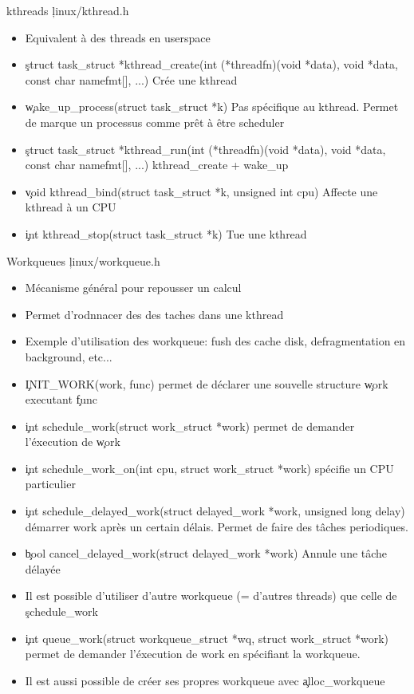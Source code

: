 \begin{frame}{kthreads}
\c{linux/kthread.h}
\begin{itemize}
\item Equivalent à des threads en userspace
\item \c{struct task_struct *kthread_create(int (*threadfn)(void *data), void *data, const char namefmt[], ...)} Crée une kthread
\item \c{wake_up_process(struct task_struct *k)} Pas spécifique au kthread. Permet de marque un processus comme prêt à être scheduler
\item \c{struct task_struct *kthread_run(int (*threadfn)(void *data), void *data, const char namefmt[], ...)} kthread_create + wake_up
\item \c{void kthread_bind(struct task_struct *k, unsigned int cpu)} Affecte une kthread à un CPU
\item \c{int kthread_stop(struct task_struct *k)} Tue une kthread
\end{itemize} 
\end{frame} 

\begin{frame}{Workqueues}
\c{linux/workqueue.h}
\begin{itemize} 
\item Mécanisme général pour repousser un calcul
\item Permet d'rodnnacer des des taches dans une kthread
\item Exemple d'utilisation des workqueue: fush des cache disk, defragmentation en background, etc...
\item \c{INIT_WORK(work, func)} permet de déclarer une souvelle structure \c{work} executant \c{func}
\item \c{int schedule_work(struct work_struct *work)} permet de demander l'éxecution de \c{work}
\item \c{int schedule_work_on(int cpu, struct work_struct *work)} spécifie un CPU particulier
\item \c{int schedule_delayed_work(struct delayed_work *work, unsigned long delay)} démarrer work après un certain délais. Permet de faire des tâches periodiques.
\item \c{bool cancel_delayed_work(struct delayed_work *work)} Annule une tâche délayée
\item Il est possible d'utiliser d'autre workqueue (= d'autres threads) que celle de \c{schedule_work}
\item \c{int queue_work(struct workqueue_struct *wq, struct work_struct *work)} permet de demander l'éxecution de work en spécifiant la workqueue.
\item Il est aussi possible de créer ses propres workqueue avec \c{alloc_workqueue}
\end{itemize}
\end{frame}

